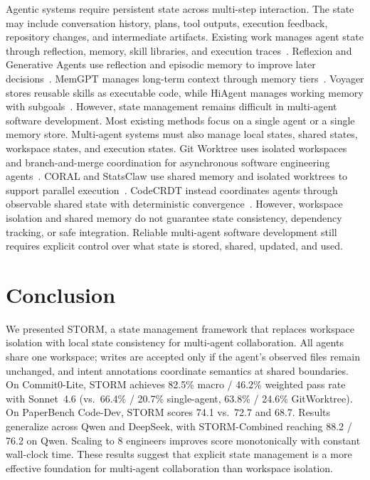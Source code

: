 \documentclass{article}
\begin{document}
Agentic systems require persistent state across multi-step interaction. The state may include conversation history, plans, tool outputs, execution feedback, repository changes, and intermediate artifacts. Existing work manages agent state through reflection, memory, skill libraries, and execution traces~\citep{reflexion,generativeagents,memgpt,voyager,hiagent}. Reflexion and Generative Agents use reflection and episodic memory to improve later decisions~\citep{reflexion,generativeagents}. MemGPT manages long-term context through memory tiers~\citep{memgpt}. Voyager stores reusable skills as executable code, while HiAgent manages working memory with subgoals~\citep{voyager,hiagent}. However, state management remains difficult in multi-agent software development. Most existing methods focus on a single agent or a single memory store. Multi-agent systems must also manage local states, shared states, workspace states, and execution states. Git Worktree uses isolated workspaces and branch-and-merge coordination for asynchronous software engineering agents~\citep{caid}. CORAL and StatsClaw use shared memory and isolated worktrees to support parallel execution~\citep{coral,statsclaw}. CodeCRDT instead coordinates agents through observable shared state with deterministic convergence~\citep{codecrdt}. However, workspace isolation and shared memory do not guarantee state consistency, dependency tracking, or safe integration. Reliable multi-agent software development still requires explicit control over what state is stored, shared, updated, and used.

\section{Conclusion}
\label{sec:conclusion}

We presented STORM, a state management framework that replaces workspace isolation with local state consistency for multi-agent collaboration. All agents share one workspace; writes are accepted only if the agent's observed files remain unchanged, and intent annotations coordinate semantics at shared boundaries. On Commit0-Lite, STORM achieves 82.5\% macro / 46.2\% weighted pass rate with Sonnet~4.6 (vs.\ 66.4\% / 20.7\% single-agent, 63.8\% / 24.6\% GitWorktree). On PaperBench Code-Dev, STORM scores 74.1 vs.\ 72.7 and 68.7. Results generalize across Qwen and DeepSeek, with STORM-Combined reaching 88.2 / 76.2 on Qwen. Scaling to 8 engineers improves score monotonically with constant wall-clock time. These results suggest that explicit state management is a more effective foundation for multi-agent collaboration than workspace isolation. 
\end{document}
